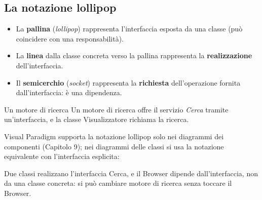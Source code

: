 \subsection{La notazione lollipop}

\begin{itemize}
  \item La \textbf{pallina} (\textit{lollipop}) rappresenta l'interfaccia esposta da una classe (può coincidere con una responsabilità).
  \item La \textbf{linea} dalla classe concreta verso la pallina rappresenta la \textbf{realizzazione} dell'interfaccia.
  \item Il \textbf{semicerchio} (\textit{socket}) rappresenta la \textbf{richiesta} dell'operazione fornita dall'interfaccia: è una
        dipendenza.
\end{itemize}

\begin{esempio}{Un motore di ricerca}
Un motore di ricerca offre il servizio \textit{Cerca} tramite un'interfaccia, e la classe Visualizzatore richiama la ricerca.
\begin{center}
\end{center}
Visual Paradigm supporta la notazione lollipop solo nei diagrammi dei componenti (Capitolo 9); nei diagrammi delle classi si usa
la notazione equivalente con l'interfaccia esplicita:
\begin{center}
\end{center}
Due classi realizzano l'interfaccia Cerca, e il Browser dipende dall'interfaccia, non da una classe concreta: si può cambiare
motore di ricerca senza toccare il Browser.
\end{esempio}

